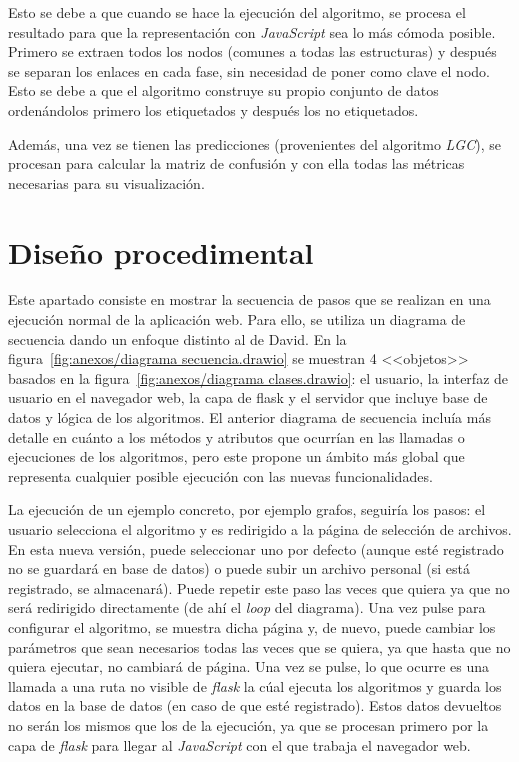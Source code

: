 Esto se debe a que cuando se hace la ejecución del algoritmo, se procesa el resultado para que la representación con \textit{JavaScript} sea lo más cómoda posible. Primero se extraen todos los nodos (comunes a todas las estructuras) y después se separan los enlaces en cada fase, sin necesidad de poner como clave el nodo. Esto se debe a que el algoritmo construye su propio conjunto de datos ordenándolos primero los etiquetados y después los no etiquetados.

Además, una vez se tienen las predicciones (provenientes del algoritmo \textit{LGC}), se procesan para calcular la matriz de confusión y con ella todas las métricas necesarias para su visualización.
\section{Diseño procedimental}
Este apartado consiste en mostrar la secuencia de pasos que se realizan en una ejecución normal de la aplicación web. Para ello, se utiliza un diagrama de secuencia dando un enfoque distinto al de David. En la figura~\ref{fig:anexos/diagrama secuencia.drawio} se muestran 4 <<objetos>> basados en la figura~\ref{fig:anexos/diagrama clases.drawio}: el usuario, la interfaz de usuario en el navegador web, la capa de flask y el servidor que incluye base de datos y lógica de los algoritmos. El anterior diagrama de secuencia incluía más detalle en cuánto a los métodos y atributos que ocurrían en las llamadas o ejecuciones de los algoritmos, pero este propone un ámbito más global que representa cualquier posible ejecución con las nuevas funcionalidades.

La ejecución de un ejemplo concreto, por ejemplo grafos, seguiría los pasos: el usuario selecciona el algoritmo y es redirigido a la página de selección de archivos. En esta nueva versión, puede seleccionar uno por defecto (aunque esté registrado no se guardará en base de datos) o puede subir un archivo personal (si está registrado, se almacenará). Puede repetir este paso las veces que quiera ya que no será redirigido directamente (de ahí el \textit{loop} del diagrama). Una vez pulse para configurar el algoritmo, se muestra dicha página y, de nuevo, puede cambiar los parámetros que sean necesarios todas las veces que se quiera, ya que hasta que no quiera ejecutar, no cambiará de página. Una vez se pulse, lo que ocurre es una llamada a una ruta no visible de \textit{flask} la cúal ejecuta los algoritmos y guarda los datos en la base de datos (en caso de que esté registrado). Estos datos devueltos no serán los mismos que los de la ejecución, ya que se procesan primero por la capa de \textit{flask} para llegar al \textit{JavaScript} con el que trabaja el navegador web.

